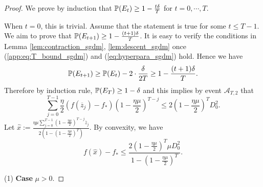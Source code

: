 \documentclass{article} %
\numberwithin{equation}{section}
\renewcommand{\eqref}[1]{(\ref{#1})}
\begin{document}
\begin{proof}
    We prove by induction that $\mathbb{P}(E_t)\geq 1-\frac{t\delta}{T}$ for $t=0, \cdots, T$.
    
    When $t=0$, this is trivial. Assume that the statement is true for some $t\leq T-1$. We aim to prove that $\mathbb{P}(E_{t+1})\geq 1-\frac{(t+1)\delta}{T}$. 
    It is easy to verify the conditions in Lemma \ref{lem:contraction_sgdm}, \ref{lem:descent_sgdm} once \eqref{app:eq:T_bound_sgdm} and \eqref{eq:hyperpara_sgdm} hold.
    Hence we have
    \begin{equation}
        \mathbb{P}(E_{t+1}) \geq \mathbb{P}(E_t) - 2\cdot \frac{\delta}{2T} \geq 1-\frac{(t+1)\delta}{T}.
    \end{equation}
    Therefore by induction rule, $\mathbb{P}(E_T)\geq 1-\delta$ and this implies by event $\mathcal{A}_{T, 2}$ that
    \begin{equation}
        \sum_{j=0}^{T-1}\frac{\eta}{2}(f(\overline{z}_j)-f_*)\left(1-\frac{\eta\mu}{2}\right)^{T-j} \leq 2\left(1-\frac{\eta\mu}{2}\right)^TD_0^2.
    \end{equation}
    Let $\hat{x}:=\frac{\eta\mu\sum_{j=0}^{T-1}(1-\frac{\eta\mu}{2})^{T-j}\overline{z}_j}{2(1-(1-\frac{\eta\mu}{2})^T)}$. By convexity, we have
    \begin{equation}\label{eq:general_bd_sgdm}
        f(\hat{x})-f_* \leq \frac{2(1-\frac{\eta\mu}{2})^T\mu D_0^2}{1-(1-\frac{\eta\mu}{2})^T}.
    \end{equation}

    (1) \textbf{Case} $\mu>0$.


\end{proof}
\end{document}
